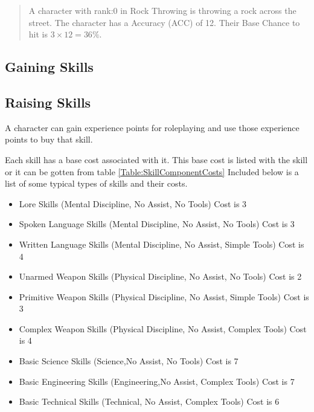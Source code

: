 \begin{quote}
A character with rank:0 in Rock Throwing is throwing a rock 
across the street. The character has a Accuracy (ACC) of 12. Their Base Chance 
to hit is \( 3 \times 12 = 36\% \).
\end{quote}

\subsection{Gaining Skills}

\subsection{Raising Skills}

A character can gain experience points for roleplaying and use those
experience points to buy that skill.



Each skill has a base cost associated with it. This base cost is listed
with the skill or it can be gotten from table
\ref{Table:SkillComponentCosts} Included below is a list of some typical types of skills and their costs.

\begin{itemize}
	\item Lore Skills {\small (Mental Discipline, No Assist, No Tools)} Cost is 3
	\item Spoken Language Skills {\small (Mental Discipline, No Assist, No Tools)} Cost is 3
	\item Written Language Skills {\small (Mental Discipline, No Assist, Simple Tools)} Cost is 4
	\item Unarmed Weapon Skills {\small (Physical Discipline, No Assist, No Tools)} Cost is 2
	\item Primitive Weapon Skills {\small (Physical Discipline, No Assist, Simple Tools)} Cost is 3
	\item Complex Weapon Skills {\small (Physical Discipline, No Assist, Complex Tools)} Cost is 4
	\item Basic Science Skills {\small (Science,No Assist, No Tools)} Cost is 7
	\item Basic Engineering Skills {\small (Engineering,No Assist, Complex Tools)} Cost is 7
	\item Basic Technical Skills {\small (Technical, No Assist, Complex Tools)} Cost is 6
\end{itemize}


